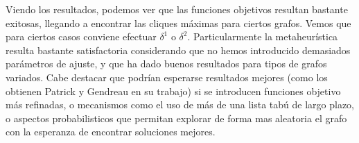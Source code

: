 Viendo los resultados, podemos ver que las funciones objetivos resultan bastante exitosas, llegando a encontrar las cliques máximas para ciertos grafos. Vemos que para ciertos casos conviene efectuar $\delta^{1}$ o $\delta^{2}$. Particularmente la metaheurística resulta bastante satisfactoria considerando que no hemos introducido demasiados parámetros de ajuste, y que ha dado buenos resultados para tipos de grafos variados. Cabe destacar que podrían esperarse resultados mejores (como los obtienen Patrick y Gendreau en su trabajo) si se introducen funciones objetivo más refinadas, o mecanismos como el uso de más de una lista tabú de largo plazo, o aspectos probabilisticos que permitan explorar de forma mas aleatoria el grafo con la esperanza de encontrar soluciones mejores.